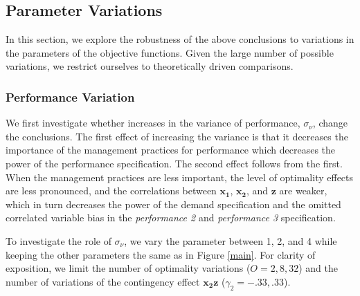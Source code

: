 \documentclass[12pt]{article}
\begin{document}
\subsection{Parameter Variations}\label{parameter-variations}

In this section, we explore the robustness of the above conclusions to variations in the parameters of the objective functions. Given the large number of possible variations, we restrict ourselves to theoretically driven comparisons.

\subsubsection{Performance Variation}\label{performance-variation}

We first investigate whether increases in the variance of performance, $\sigma_{\nu}$, change the conclusions. The first effect of increasing the variance is that it decreases the importance of the management practices for performance which decreases the power of the performance specification. The second effect follows from the first. When the management practices are less important, the level of optimality effects are less pronounced, and the correlations between $\mathbf{x_1}$, $\mathbf{x_2}$, and $\mathbf{z}$ are weaker, which in turn decreases the power of the demand specification and the omitted correlated variable bias in the \emph{performance 2} and \emph{performance 3} specification.

To investigate the role of $\sigma_{\nu}$, we vary the parameter between 1, 2, and 4 while keeping the other parameters the same as in Figure \ref{main}. For clarity of exposition, we limit the number of optimality variations ($O = 2, 8, 32$) and the number of variations of the contingency effect $\mathbf{x_2 z}$ ($\gamma_2 = -.33, .33$).
\end{document}

